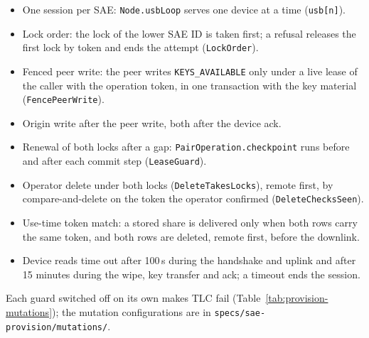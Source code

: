 \documentclass[11pt,a4paper]{article}
\begin{document}
\begin{itemize}
  \setlength{\itemsep}{0.15em}
  \item One session per SAE: \texttt{Node.usbLoop} serves one device at a
        time (\texttt{usb[n]}).
  \item Lock order: the lock of the lower SAE ID is taken first; a refusal
        releases the first lock by token and ends the attempt
        (\texttt{LockOrder}).
  \item Fenced peer write: the peer writes \texttt{KEYS\_AVAILABLE} only under
        a live lease of the caller with the operation token, in one
        transaction with the key material (\texttt{FencePeerWrite}).
  \item Origin write after the peer write, both after the device ack.
  \item Renewal of both locks after a gap: \texttt{PairOperation.checkpoint}
        runs before and after each commit step (\texttt{LeaseGuard}).
  \item Operator delete under both locks (\texttt{DeleteTakesLocks}), remote
        first, by compare-and-delete on the token the operator confirmed
        (\texttt{DeleteChecksSeen}).
  \item Use-time token match: a stored share is delivered only when both rows
        carry the same token, and both rows are deleted, remote first, before
        the downlink.
  \item Device reads time out after 100\,s during the handshake and uplink and
        after 15 minutes during the wipe, key transfer and ack; a timeout ends
        the session.
\end{itemize}

\noindent
Each guard switched off on its own makes TLC fail
(Table~\ref{tab:provision-mutations}); the mutation configurations are in
\texttt{specs/sae-provision/mutations/}.
\end{document}
